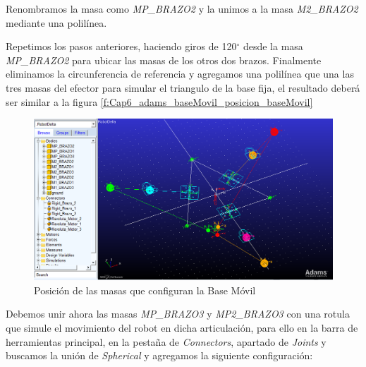         Renombramos la masa como \textit{MP\_BRAZO2} y la unimos a la masa \textit{M2\_BRAZO2} mediante una polilínea.
        
        Repetimos los pasos anteriores, haciendo giros de 120$^{\circ}$ desde la masa \textit{MP\_BRAZO2} para ubicar las masas de los otros dos brazos. Finalmente eliminamos la circunferencia de referencia y agregamos una polilínea que una las tres masas del efector para simular el triangulo de la base fija, el resultado deberá ser similar a la figura \eqref{f:Cap6_adams_baseMovil_posicion_baseMovil} 

         \begin{figure}[h]
            \centering
            \includegraphics[width=1\linewidth]{Main/Chapter6/Images6/adams/base-movil/base_movil.png}
            \caption{Posición de las masas que configuran la Base Móvil}
            \label{f:Cap6_adams_baseMovil_posicion_baseMovil}
        \end{figure}
        
        Debemos  unir ahora las masas \textit{MP\_BRAZO3} y \textit{MP2\_BRAZO3} con una rotula que simule el movimiento del robot en dicha articulación, para ello en la barra de herramientas principal, en la pestaña de \textit{Connectors}, apartado de \textit{Joints} y buscamos la unión de \textit{Spherical} y agregamos la siguiente configuración:
        
